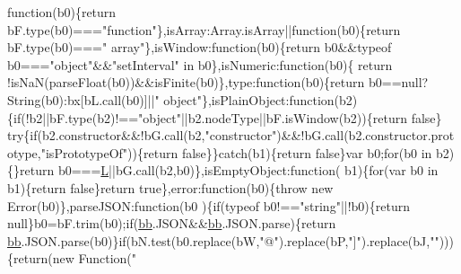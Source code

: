 \begin{DoxyCode}
{      function}(b0)\{\textcolor{keywordflow}{return} bF.type(b0)===\textcolor{stringliteral}{"function"}\},isArray:Array.isArray||\textcolor{keyword}{function}(b0)\{\textcolor{keywordflow}{return} bF.type(b0)===\textcolor{stringliteral}{"
      array"}\},isWindow:\textcolor{keyword}{function}(b0)\{\textcolor{keywordflow}{return} b0&&typeof b0===\textcolor{stringliteral}{"object"}&&\textcolor{stringliteral}{"setInterval"} in b0\},isNumeric:\textcolor{keyword}{function}(b0)\{\textcolor{keywordflow}{
      return} !isNaN(parseFloat(b0))&&isFinite(b0)\},type:\textcolor{keyword}{function}(b0)\{\textcolor{keywordflow}{return} b0==null?String(b0):bx[bL.call(b0)]||\textcolor{stringliteral}{"
      object"}\},isPlainObject:function(b2)\{\textcolor{keywordflow}{if}(!b2||bF.type(b2)!==\textcolor{stringliteral}{"object"}||b2.nodeType||bF.isWindow(b2))\{\textcolor{keywordflow}{return} \textcolor{keyword}{false}\}\textcolor{keywordflow}{
      try}\{\textcolor{keywordflow}{if}(b2.constructor&&!bG.call(b2,\textcolor{stringliteral}{"constructor"})&&!bG.call(b2.constructor.prototype,\textcolor{stringliteral}{"isPrototypeOf"}))\{\textcolor{keywordflow}{return} \textcolor{keyword}{
      false}\}\}\textcolor{keywordflow}{catch}(b1)\{\textcolor{keywordflow}{return} \textcolor{keyword}{false}\}var b0;\textcolor{keywordflow}{for}(b0 in b2)\{\}\textcolor{keywordflow}{return} b0===\hyperlink{docs_2_programmer's_manual_2html_2jquery_8js_a38ee4c0b5f4fe2a18d0c783af540d253}{L}||bG.call(b2,b0)\},isEmptyObject:\textcolor{keyword}{function}(
      b1)\{\textcolor{keywordflow}{for}(var b0 in b1)\{\textcolor{keywordflow}{return} \textcolor{keyword}{false}\}\textcolor{keywordflow}{return} \textcolor{keyword}{true}\},error:\textcolor{keyword}{function}(b0)\{\textcolor{keywordflow}{throw} \textcolor{keyword}{new} Error(b0)\},parseJSON:\textcolor{keyword}{function}(b0
      )\{\textcolor{keywordflow}{if}(typeof b0!==\textcolor{stringliteral}{"string"}||!b0)\{\textcolor{keywordflow}{return} null\}b0=bF.trim(b0);\textcolor{keywordflow}{if}(\hyperlink{docs_2_programmer's_manual_2html_2jquery_8js_a1d6558865876e1c8cca029fce41a4bdb}{bb}.JSON&&\hyperlink{docs_2_programmer's_manual_2html_2jquery_8js_a1d6558865876e1c8cca029fce41a4bdb}{bb}.JSON.parse)\{\textcolor{keywordflow}{return} 
      \hyperlink{docs_2_programmer's_manual_2html_2jquery_8js_a1d6558865876e1c8cca029fce41a4bdb}{bb}.JSON.parse(b0)\}\textcolor{keywordflow}{if}(bN.test(b0.replace(bW,\textcolor{stringliteral}{"@"}).replace(bP,\textcolor{stringliteral}{"]"}).replace(bJ,\textcolor{stringliteral}{""})))\{\textcolor{keywordflow}{return}(\textcolor{keyword}{new} Function(\textcolor{stringliteral}{"
}
\end{DoxyCode}
